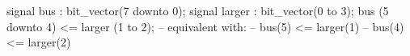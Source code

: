 signal bus : bit_vector(7 downto 0);
signal larger : bit_vector(0 to 3);
bus (5 downto 4) <= larger (1 to 2);
-- equivalent with:
-- bus(5) <= larger(1)
-- bus(4) <= larger(2)